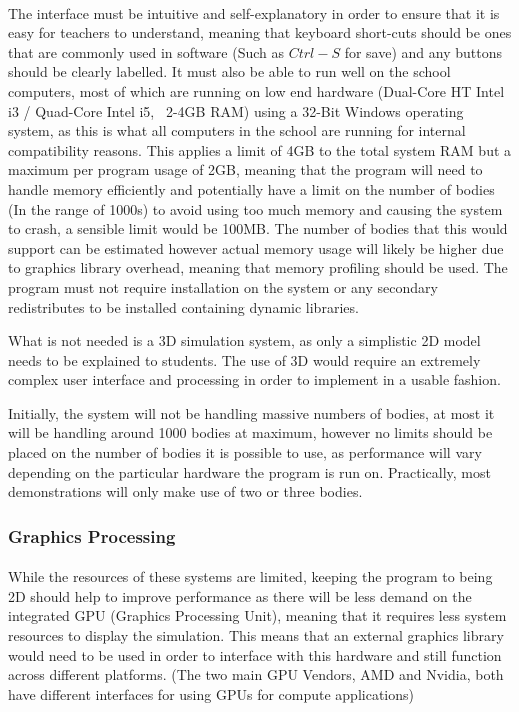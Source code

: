 \paragraph{}
The interface must be intuitive and self-explanatory in order to ensure that it is easy for teachers to understand, meaning that keyboard short-cuts should be ones that are commonly used in software (Such as $Ctrl-S$ for save) and any buttons should be clearly labelled. It must also be able to run well on the school computers, most of which are running on low end hardware (Dual-Core HT Intel i3 / Quad-Core Intel i5, ~2-4GB RAM) using a 32-Bit Windows operating system, as this is what all computers in the school are running for internal compatibility reasons. This applies a limit of 4GB to the total system RAM but a maximum per program usage of 2GB, meaning that the program will need to handle memory efficiently and potentially have a limit on the number of bodies (In the range of 1000s) to avoid using too much memory and causing the system to crash, a sensible limit would be 100MB. The number of bodies that this would support can be estimated however actual memory usage will likely be higher due to graphics library overhead, meaning that memory profiling should be used. The program must not require installation on the system or any secondary redistributes to be installed containing dynamic libraries.

What is not needed is a 3D simulation system, as only a simplistic 2D model needs to be explained to students. The use of 3D would require an extremely complex user interface and processing in order to implement in a usable fashion.

Initially, the system will not be handling massive numbers of bodies, at most it will be handling around 1000 bodies at maximum, however no limits should be placed on the number of bodies it is possible to use, as performance will vary depending on the particular hardware the program is run on. Practically, most demonstrations will only make use of two or three bodies.

\subsubsection{Graphics Processing}

\paragraph{}
While the resources of these systems are limited, keeping the program to being 2D should help to improve performance as there will be less demand on the integrated GPU (Graphics Processing Unit), meaning that it requires less system resources to display the simulation. This means that an external graphics library would need to be used in order to interface with this hardware and still function across different platforms. (The two main GPU Vendors, AMD and Nvidia, both have different interfaces for using GPUs for compute applications) 

